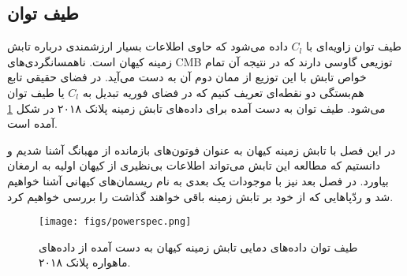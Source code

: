 \subsection{ طیف توان}
طیف توان زاویه‌ای
با $C_l$ داده می‌شود که حاوی اطلاعات بسیار ارزشمندی درباره تابش زمینه کیهان است. ناهمسانگردی‌های CMB توزیعی گاوسی دارند که در نتیجه آن تمام خواص تابش با این توزیع از ممان دوم آن به دست می‌آید. در فضای حقیقی تابع هم‌بستگی دو نقطه‌ای تعریف کنیم که در فضای فوریه تبدیل به $C_l$ یا طیف توان می‌شود. طیف توان به دست آمده برای داده‌های تابش زمینه پلانک ۲۰۱۸ در شکل
\ref{fig:power}
آمده است.
\par
در این فصل با تابش زمینه کیهان به عنوان فوتون‌های بازمانده از مهبانگ آشنا شدیم و دانستیم که مطالعه این تابش می‌تواند اطلاعات بی‌نظیری از کیهان اولیه به ارمغان بیاورد. در فصل بعد نیز با موجودات یک بعدی به نام ریسمان‌های کیهانی آشنا خواهیم شد و ردّپاهایی که از خود بر تابش زمینه باقی خواهند گذاشت را بررسی خواهیم کرد. 
\begin{figure}
	\begin{center}
		\texttt{[image: figs/powerspec.png]}
	\end{center}
	\caption	
	{	طیف توان داده‌های دمایی تابش زمینه کیهان به دست آمده از داده‌های ماهواره پلانک ۲۰۱۸.
		\cite{akrami2018legacy}
	}
	\label{fig:power}
\end{figure}


